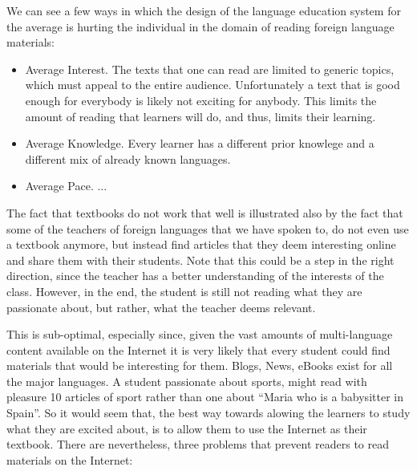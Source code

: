 We can see a few ways in which the design of the language education system for the average is hurting the individual in the domain of reading foreign language materials: 

\begin{itemize}
	\item Average Interest. The texts that one can read are limited to generic topics, which must appeal to the entire audience. Unfortunately a text that is good enough for everybody is likely not exciting for anybody. This limits the amount of reading that learners will do, and thus, limits their learning.
	\item Average Knowledge.  Every learner has a different prior knowlege and a different mix of already known languages. 
	\item Average Pace. ... 
\end{itemize}


The fact that textbooks do not work that well is illustrated also by the fact that some of the teachers of foreign languages that we have spoken to, do not even use a textbook anymore, but instead find articles that they deem interesting online and share them with their students. Note that this could be a step in the right direction, since the teacher has a better understanding of the interests of the class. However, in the end, the student is still not reading what they are passionate about, but rather, what the teacher deems relevant. 

This is sub-optimal, especially since, given the vast amounts of multi-language content available on the Internet it is very likely that every student could find materials that would be interesting for them. Blogs, News, eBooks exist for all the major languages. A student passionate about sports, might read with pleasure 10 articles of sport rather than one about ``Maria who is a babysitter in Spain''. So it would seem that, the best way towards alowing the learners to study what they are excited about, is to allow them to use the Internet as their textbook. There are nevertheless, three problems that prevent readers to read materials on the Internet:

